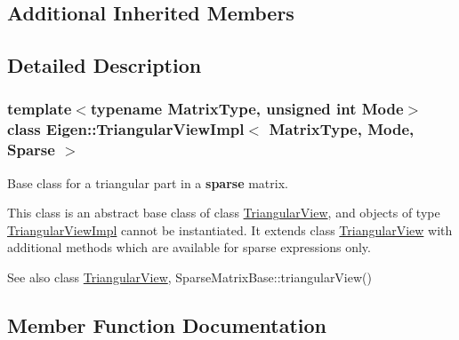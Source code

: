 \subsection*{Additional Inherited Members}


\subsection{Detailed Description}
\subsubsection*{template$<$typename Matrix\+Type, unsigned int Mode$>$\newline
class Eigen\+::\+Triangular\+View\+Impl$<$ Matrix\+Type, Mode, Sparse $>$}

Base class for a triangular part in a {\bfseries{sparse}} matrix. 

This class is an abstract base class of class \mbox{\hyperlink{class_eigen_1_1_triangular_view}{Triangular\+View}}, and objects of type \mbox{\hyperlink{class_eigen_1_1_triangular_view_impl}{Triangular\+View\+Impl}} cannot be instantiated. It extends class \mbox{\hyperlink{class_eigen_1_1_triangular_view}{Triangular\+View}} with additional methods which are available for sparse expressions only.

\begin{DoxySeeAlso}{See also}
class \mbox{\hyperlink{class_eigen_1_1_triangular_view}{Triangular\+View}}, Sparse\+Matrix\+Base\+::triangular\+View() 
\end{DoxySeeAlso}


\subsection{Member Function Documentation}
\mbox{\label{class_eigen_1_1_triangular_view_impl_3_01_matrix_type_00_01_mode_00_01_sparse_01_4_a3f3385e827fcc0bf27d1ec21c80740bc}} 
